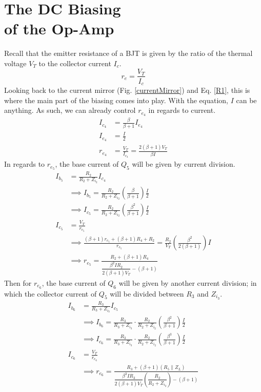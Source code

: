 \documentclass[lettersize,journal]{IEEEtran}
\begin{document}
\section{The DC Biasing \\of the Op-Amp}
Recall that the emitter resistance of a BJT is given by the ratio of 
the thermal voltage $V_T$ to the collector current $I_c$.
\begin{equation}
  r_e = \frac{V_T}{I_c}
\end{equation}
Looking back to the current mirror (Fig. \ref{currentMirror}) and 
Eq. \eqref{R1}, this is where the main part of the biasing comes into play. 
With the equation, $I$ can be anything. As such, we can already control 
$r_{e_4}$ in regards to current.
\begin{align}
  I_{c_4} &= \frac{\beta}{\beta + 1} I_{e_4} \\[1ex]
  I_{e_4} &= \frac{I}{2} \\[1ex]
  r_{e_4} &= \frac{V_T}{I_{c_4}} = \frac{2 \left(\beta+1\right) V_T}{\beta I}\label{re4}
\end{align}
In regards to $r_{e_5}$, the base current of $Q_5$ will be 
given by current division.
{\footnotesize
\begin{align}
  I_{b_5} &= \frac{R_2}{R_2 + Z_{i_2}} I_{c_4} \\[1ex]
          &\implies I_{b_5} = \frac{R_2}{R_2 + Z_{i_2}}\left(\frac{\beta}{\beta + 1}\right)\frac{I}{2} \\[1ex]
          &\implies I_{c_5} = \frac{R_2}{R_2 + Z_{i_2}}\left(\frac{\beta^2}{\beta + 1}\right)\frac{I}{2} \\[1ex]
  I_{c_5} &= \frac{V_T}{r_{e_5}} \\[1ex]
          &\implies \frac{(\beta+1)r_{e_5} + (\beta + 1)R_4 + R_2}{r_{e_5}} = \frac{R_2}{V_T} \left(\frac{\beta^2}{2(\beta+1)}\right)I \\[1ex]
          &\implies r_{e_5} = \frac{R_2 + (\beta+1)R_4}{\dfrac{\beta^2 I R_2}{2(\beta+1)V_T} - (\beta + 1)}\label{re5}
\end{align}
}
Then for $r_{e_6}$, the base current of $Q_6$ will be given by another 
current division; in which the collector current of $Q_5$ will be divided between 
$R_3$ and $Z_{i_3}$.
{\footnotesize
\begin{align}
  I_{b_6} &= \frac{R_3}{R_3 + Z_{i_3}} I_{c_5} \\[1ex]
          &\implies I_{b_6} = \frac{R_3}{R_3 + Z_{i_3}}\cdot\frac{R_2}{R_2 + Z_{i_2}}\left(\frac{\beta^2}{\beta + 1}\right)\frac{I}{2} \\[1ex]
          &\implies I_{c_6} = \frac{R_3}{R_3 + Z_{i_3}}\cdot\frac{R_2}{R_2 + Z_{i_2}}\left(\frac{\beta^3}{\beta + 1}\right)\frac{I}{2} \\[1ex]
  I_{c_6} &= \frac{V_T}{r_{e_6}} \\[1ex]
          &\implies r_{e_6} = \frac{R_3 + (\beta+1)(R_5\parallel Z_L)}{\dfrac{\beta^3 I R_3}{2(\beta+1)V_T} \left(\dfrac{R_2}{R_2 + Z_{i_2}}\right) - (\beta + 1)}\label{re6}
\end{align}
}
\end{document}
